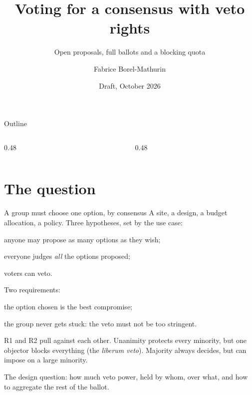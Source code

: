 \documentclass[10pt,aspectratio=169]{beamer}
\title{Voting for a consensus with veto rights}
\subtitle{Open proposals, full ballots and a blocking quota}
\author{Fabrice Borel-Mathurin}
\institute{Research seminar}
\date{Draft, October 2026}
\begin{document}
\maketitle

\begin{frame}{Outline}
  \begin{columns}[T]
    \begin{column}{0.48\textwidth}\tableofcontents[sections={1-4}]\end{column}
    \begin{column}{0.48\textwidth}\tableofcontents[sections={5-7}]\end{column}
  \end{columns}
\end{frame}

\section{The question}

\begin{frame}{A group must choose one option, by consensus}
  A site, a design, a budget allocation, a policy. Three hypotheses, set by the use case:
  \begin{description}
    \item[H1 (open agenda)] anyone may propose as many options as they wish;
    \item[H2 (full ballots)] everyone judges \emph{all} the options proposed;
    \item[H3 (veto rights)] voters can veto.
  \end{description}
  Two requirements:
  \begin{description}
    \item[R1] the option chosen is the \alert{best compromise};
    \item[R2] the group \alert{never gets stuck}: the veto must not be too stringent.
  \end{description}
  \medskip
  R1 and R2 pull against each other. Unanimity protects every minority, but one objector blocks
  everything (the \emph{liberum veto}). Majority always decides, but can impose on a large minority.
  \medskip

  \alert{The design question:} how much veto power, held by whom, over what, and how to aggregate the
  rest of the ballot.
\end{frame}
\end{document}
